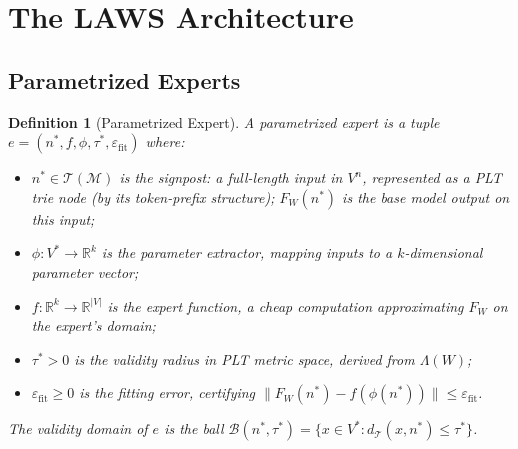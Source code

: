 \documentclass[11pt]{article}
\newtheorem{definition}{Definition}
\begin{document}
\section{The LAWS Architecture}
\label{sec:laws_def}

\subsection{Parametrized Experts}

\begin{definition}[Parametrized Expert]
\label{def:expert}
A \emph{parametrized expert} is a tuple $e = (n^*, f, \phi, \tau^*, \varepsilon_{\mathrm{fit}})$ where:
\begin{itemize}[leftmargin=2em]
  \item $n^* \in \mathcal{T}(\mathcal{M})$ is the \emph{signpost}: a full-length input in $V^n$, represented
        as a PLT trie node (by its token-prefix structure); $F_W(n^*)$ is the base model output on this input;
  \item $\phi: V^* \to \mathbb{R}^k$ is the \emph{parameter extractor}, mapping
        inputs to a $k$-dimensional parameter vector;
  \item $f: \mathbb{R}^k \to \mathbb{R}^{|V|}$ is the \emph{expert function},
        a cheap computation approximating $F_W$ on the expert's domain;
  \item $\tau^* > 0$ is the \emph{validity radius} in PLT metric space,
        derived from $\Lambda(W)$;
  \item $\varepsilon_{\mathrm{fit}} \geq 0$ is the \emph{fitting error},
        certifying $\|F_W(n^*) - f(\phi(n^*))\| \leq \varepsilon_{\mathrm{fit}}$.
\end{itemize}
The \emph{validity domain} of $e$ is the ball
$\mathcal{B}(n^*, \tau^*) = \{x \in V^* : d_{\mathcal{T}}(x, n^*) \leq \tau^*\}$.
\end{definition}
\end{document}
